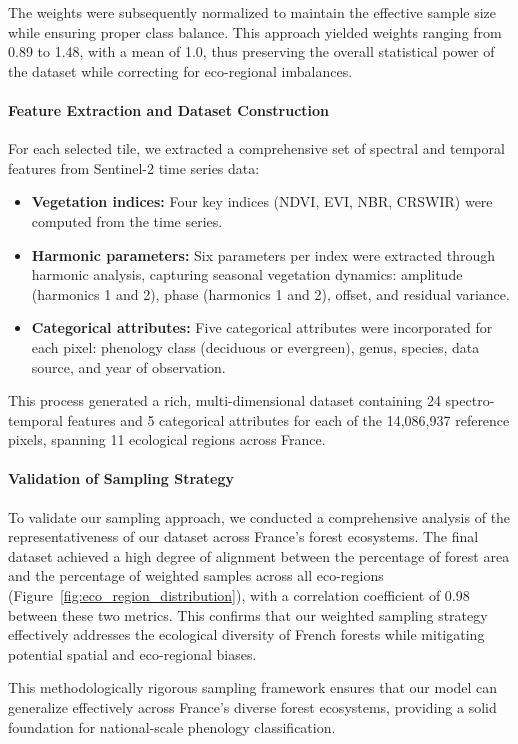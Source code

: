 The weights were subsequently normalized to maintain the effective sample size while ensuring proper class balance. This approach yielded weights ranging from 0.89 to 1.48, with a mean of 1.0, thus preserving the overall statistical power of the dataset while correcting for eco-regional imbalances.

\paragraph{Feature Extraction and Dataset Construction}
For each selected tile, we extracted a comprehensive set of spectral and temporal features from Sentinel-2 time series data:

\begin{itemize}
    \item \textbf{Vegetation indices:} Four key indices (NDVI, EVI, NBR, CRSWIR) were computed from the time series.
    \item \textbf{Harmonic parameters:} Six parameters per index were extracted through harmonic analysis, capturing seasonal vegetation dynamics: amplitude (harmonics 1 and 2), phase (harmonics 1 and 2), offset, and residual variance.
    \item \textbf{Categorical attributes:} Five categorical attributes were incorporated for each pixel: phenology class (deciduous or evergreen), genus, species, data source, and year of observation.
\end{itemize}

This process generated a rich, multi-dimensional dataset containing 24 spectro-temporal features and 5 categorical attributes for each of the 14,086,937 reference pixels, spanning 11 ecological regions across France.

\paragraph{Validation of Sampling Strategy}
To validate our sampling approach, we conducted a comprehensive analysis of the representativeness of our dataset across France's forest ecosystems. The final dataset achieved a high degree of alignment between the percentage of forest area and the percentage of weighted samples across all eco-regions (Figure~\ref{fig:eco_region_distribution}), with a correlation coefficient of 0.98 between these two metrics. This confirms that our weighted sampling strategy effectively addresses the ecological diversity of French forests while mitigating potential spatial and eco-regional biases.

This methodologically rigorous sampling framework ensures that our model can generalize effectively across France's diverse forest ecosystems, providing a solid foundation for national-scale phenology classification. 
